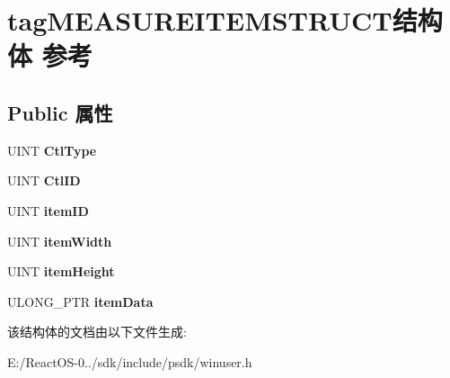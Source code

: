 \hypertarget{structtag_m_e_a_s_u_r_e_i_t_e_m_s_t_r_u_c_t}{}\section{tag\+M\+E\+A\+S\+U\+R\+E\+I\+T\+E\+M\+S\+T\+R\+U\+C\+T结构体 参考}
\label{structtag_m_e_a_s_u_r_e_i_t_e_m_s_t_r_u_c_t}
\subsection*{Public 属性}
\begin{DoxyCompactItemize}
\item 
\mbox{\label{structtag_m_e_a_s_u_r_e_i_t_e_m_s_t_r_u_c_t_a2d050952e6ab83ebbe9b0a757f5940ee}} 
U\+I\+NT {\bfseries Ctl\+Type}
\item 
\mbox{\label{structtag_m_e_a_s_u_r_e_i_t_e_m_s_t_r_u_c_t_a2b6372624025c571cd409afe3207f735}} 
U\+I\+NT {\bfseries Ctl\+ID}
\item 
\mbox{\label{structtag_m_e_a_s_u_r_e_i_t_e_m_s_t_r_u_c_t_a9eaf8c5e2623160e2eb49eaea49c8b52}} 
U\+I\+NT {\bfseries item\+ID}
\item 
\mbox{\label{structtag_m_e_a_s_u_r_e_i_t_e_m_s_t_r_u_c_t_a0c75970725cc49ace40d1056f58d0e6e}} 
U\+I\+NT {\bfseries item\+Width}
\item 
\mbox{\label{structtag_m_e_a_s_u_r_e_i_t_e_m_s_t_r_u_c_t_a728e041af7c80702c9c0042c09e01195}} 
U\+I\+NT {\bfseries item\+Height}
\item 
\mbox{\label{structtag_m_e_a_s_u_r_e_i_t_e_m_s_t_r_u_c_t_adeb4b5059fb411943aa8496511fdf636}} 
U\+L\+O\+N\+G\+\_\+\+P\+TR {\bfseries item\+Data}
\end{DoxyCompactItemize}


该结构体的文档由以下文件生成\+:\begin{DoxyCompactItemize}
\item 
E\+:/\+React\+O\+S-\/0../sdk/include/psdk/winuser.\+h\end{DoxyCompactItemize}

